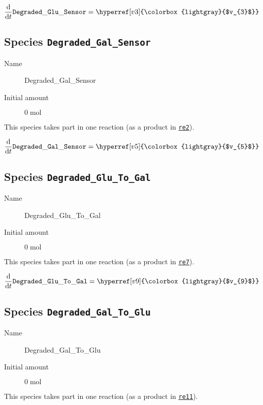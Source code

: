 \documentclass[11pt,twoside,bibtotoc,a4paper]{scrartcl}
\begin{document}
\begin{dmath}
\frac{\mathrm d}{\mathrm dt} \mathtt{Degraded\-\_Glu\-\_Sensor} = \hyperref[v3]{\colorbox{lightgray}{$v_{3}$}}
\end{dmath}

\subsection{Species \texttt{Degraded\-\_Gal\-\_Sensor}}
\begin{description}
\item[Name] Degraded\-\_Gal\-\_Sensor
\item[Initial amount] $0\;\mathrm{mol}$
\end{description}
This species takes part in one reaction (as a product in  \hyperref[v5]{\texttt{re2}}).

\begin{dmath}
\frac{\mathrm d}{\mathrm dt} \mathtt{Degraded\-\_Gal\-\_Sensor} = \hyperref[v5]{\colorbox{lightgray}{$v_{5}$}}
\end{dmath}

\subsection{Species \texttt{Degraded\-\_Glu\-\_To\-\_Gal}}
\begin{description}
\item[Name] Degraded\-\_Glu\-\_To\-\_Gal
\item[Initial amount] $0\;\mathrm{mol}$
\end{description}
This species takes part in one reaction (as a product in  \hyperref[v9]{\texttt{re7}}).

\begin{dmath}
\frac{\mathrm d}{\mathrm dt} \mathtt{Degraded\-\_Glu\-\_To\-\_Gal} = \hyperref[v9]{\colorbox{lightgray}{$v_{9}$}}
\end{dmath}

\subsection{Species \texttt{Degraded\-\_Gal\-\_To\-\_Glu}}
\begin{description}
\item[Name] Degraded\-\_Gal\-\_To\-\_Glu
\item[Initial amount] $0\;\mathrm{mol}$
\end{description}
This species takes part in one reaction (as a product in  \hyperref[v10]{\texttt{re11}}).
\end{document}
